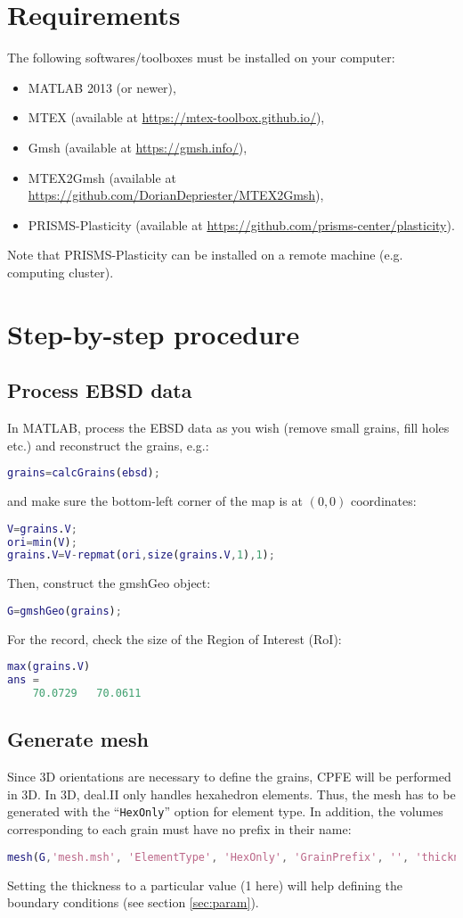 \documentclass[a4paper]{scrartcl}
\newcommand{\matlab}{MATLAB\textsuperscript{\textregistered}}
\begin{document}
\section{Requirements}
	The following softwares/toolboxes must be installed on your computer:
	\begin{itemize}
		\item MATLAB\textsuperscript{\textregistered} 2013 (or newer),
		\item MTEX (available at \url{https://mtex-toolbox.github.io/}),
		\item Gmsh (available at \url{https://gmsh.info/}),
		\item MTEX2Gmsh (available at \url{https://github.com/DorianDepriester/MTEX2Gmsh}),
		\item PRISMS-Plasticity (available at \url{https://github.com/prisms-center/plasticity}).
	\end{itemize}
	Note that PRISMS-Plasticity can be installed on a remote machine (e.g. computing cluster).

\section{Step-by-step procedure}
	\subsection{Process EBSD data}
	\label{sec:process}
	In \matlab{}, process the EBSD data as you wish (remove small grains, fill holes etc.) and reconstruct the grains, e.g.:
	\begin{lstlisting}[language=Matlab]
grains=calcGrains(ebsd);
	\end{lstlisting}
	and make sure the bottom-left corner of the map is at $(0,0)$ coordinates:
	\begin{lstlisting}[language=Matlab]
V=grains.V;
ori=min(V);
grains.V=V-repmat(ori,size(grains.V,1),1);
	\end{lstlisting}
	Then, construct the gmshGeo object:
	\begin{lstlisting}[language=Matlab]
G=gmshGeo(grains);
	\end{lstlisting}
	For the record, check the size of the Region of Interest (RoI):
	\begin{lstlisting}[language=Matlab]
max(grains.V)
ans =
	70.0729   70.0611	
	\end{lstlisting}
	
	
	\subsection{Generate mesh}
	Since 3D orientations are necessary to define the grains, CPFE will be performed in 3D. In 3D, deal.II only handles hexahedron elements. Thus, the mesh has to be generated with the ``\texttt{HexOnly}'' option for element type. In addition, the volumes corresponding to each grain must have no prefix in their name:
	\begin{lstlisting}[language=Matlab]
mesh(G,'mesh.msh', 'ElementType', 'HexOnly', 'GrainPrefix', '', 'thickness', 1)
	\end{lstlisting}
	Setting the thickness to a particular value (1 here) will help defining the boundary conditions (see section \ref{sec:param}).
	
\end{document}
